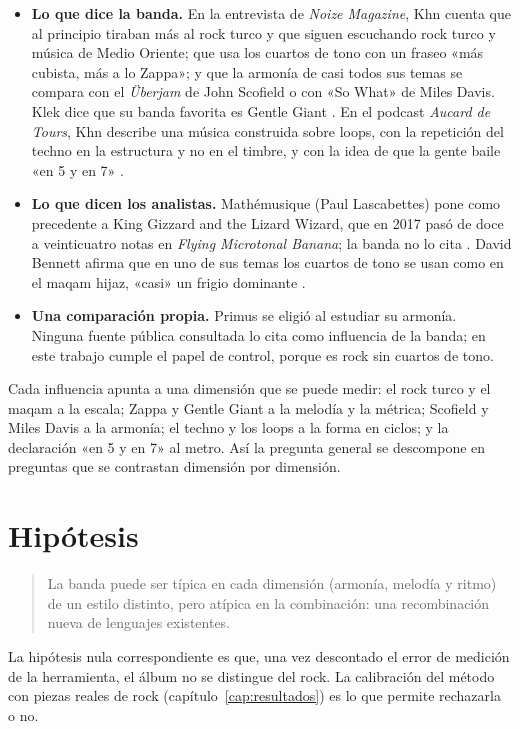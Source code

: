 \begin{itemize}
  \item \textbf{Lo que dice la banda.} En la entrevista de \emph{Noize Magazine}, Khn cuenta que al principio tiraban más
  al rock turco y que siguen escuchando rock turco y música de Medio Oriente; que usa los cuartos de tono con un fraseo
  «más cubista, más a lo Zappa»; y que la armonía de casi todos sus temas se compara con el \emph{Überjam} de John
  Scofield o con «So What» de Miles Davis. Klek dice que su banda favorita es Gentle Giant
  \citep{noize}. En el podcast \emph{Aucard de Tours}, Khn describe una música construida sobre loops, con la
  repetición del techno en la estructura y no en el timbre, y con la idea de que la gente baile «en 5 y en 7»
  \citep{aucard2026}.
  \item \textbf{Lo que dicen los analistas.} Mathémusique (Paul Lascabettes) pone como precedente a King Gizzard and the
  Lizard Wizard, que en 2017 pasó de doce a veinticuatro notas en \emph{Flying Microtonal Banana}; la banda no lo cita
  \citep{mathemusique2026}. David Bennett afirma que en uno de sus temas los cuartos de tono se usan como en el maqam
  hijaz, «casi» un frigio dominante \citep{bennett2026}.
  \item \textbf{Una comparación propia.} Primus se eligió al estudiar su armonía. Ninguna fuente pública consultada lo
  cita como influencia de la banda; en este trabajo cumple el papel de control, porque es rock sin cuartos de tono.
\end{itemize}

Cada influencia apunta a una dimensión que se puede medir: el rock turco y el maqam a la escala; Zappa y Gentle Giant a
la melodía y la métrica; Scofield y Miles Davis a la armonía; el techno y los loops a la forma en ciclos; y la
declaración «en 5 y en 7» al metro. Así la pregunta general se descompone en preguntas que se contrastan dimensión por
dimensión.

\section{Hipótesis}

\begin{quote}
La banda puede ser típica en cada dimensión (armonía, melodía y ritmo) de un estilo distinto, pero atípica en la
combinación: una recombinación nueva de lenguajes existentes.
\end{quote}

La hipótesis nula correspondiente es que, una vez descontado el error de medición de la herramienta, el álbum no se
distingue del rock. La calibración del método con piezas reales de rock (capítulo~\ref{cap:resultados}) es lo que
permite rechazarla o no.

